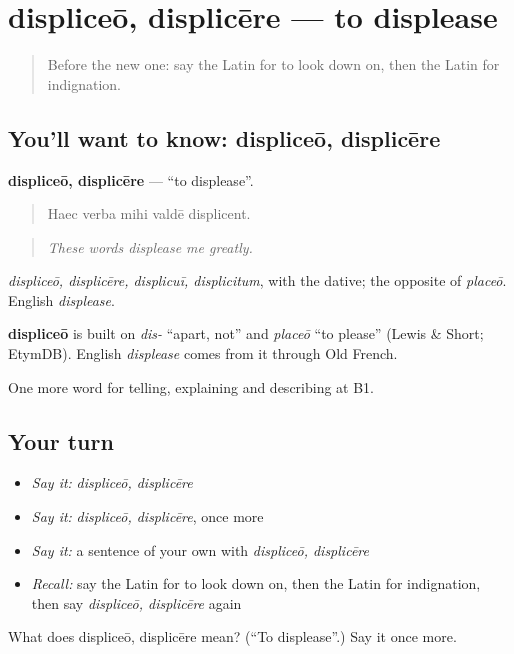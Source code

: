 \section[displiceō, displicēre]{displiceō, displicēre — to displease}

\label{lesson:LA-C514-displiceo}



\begin{quote}
Before the new one: say the Latin for to look down on, then the Latin for indignation.
\end{quote}

\subsection*{You'll want to know: displiceō, displicēre}
\textbf{displiceō, displicēre} — \textquotedblleft{}to displease\textquotedblright{}.

\begin{quote}
Haec verba mihi valdē displicent.
\end{quote}

\begin{quote}
\emph{These words displease me greatly.}
\end{quote}

\emph{displiceō, displicēre, displicuī, displicitum}, with the dative; the opposite of \emph{placeō}. English \emph{displease}.

\begin{cousinweb}
\textbf{displiceō} is built on \emph{dis-} \textquotedblleft{}apart, not\textquotedblright{} and \emph{placeō} \textquotedblleft{}to please\textquotedblright{} (Lewis \& Short; EtymDB). English \emph{displease} comes from it through Old French.
\end{cousinweb}

\begin{grammarlens}[title={What you've built}]
One more word for telling, explaining and describing at B1.
\end{grammarlens}

\subsection*{Your turn}
\begin{itemize}
\raggedright
  \item \emph{Say it:} \emph{displiceō, displicēre}
  \item \emph{Say it:} \emph{displiceō, displicēre}, once more
  \item \emph{Say it:} a sentence of your own with \emph{displiceō, displicēre}
  \item \emph{Recall:} say the Latin for to look down on, then the Latin for indignation, then say \emph{displiceō, displicēre} again
\end{itemize}

\begin{tcolorbox}[breakable,colback=teal!4,colframe=teal!35!black,title={Before you move on}]
What does displiceō, displicēre mean? (\textquotedblleft{}To displease\textquotedblright{}.) Say it once more.
\end{tcolorbox}
